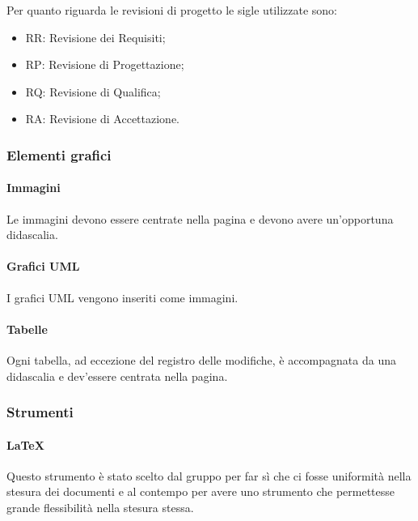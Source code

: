 Per quanto riguarda le revisioni di progetto le sigle utilizzate sono:
\begin{itemize}
    \item RR: Revisione dei Requisiti;
    \item RP: Revisione di Progettazione;
    \item RQ: Revisione di Qualifica;
    \item RA: Revisione di Accettazione.
\end{itemize}

\subsubsection{Elementi grafici}
\label{ssub:elementi_grafici}

\paragraph{Immagini}
\label{par:immagini}

Le immagini devono essere centrate nella pagina e devono avere un'opportuna didascalia.

\paragraph{Grafici UML}
\label{par:uml}

I grafici UML vengono inseriti come immagini.

\paragraph{Tabelle}
\label{par:tabelle}

Ogni tabella, ad eccezione del registro delle modifiche, è accompagnata da una didascalia e dev'essere centrata nella 
pagina.

\subsubsection{Strumenti}
\label{ssub:strumenti}

\paragraph{\LaTeX}
\label{par:latex}

Questo strumento è stato scelto dal gruppo per far sì che ci fosse uniformità nella stesura dei documenti e al contempo 
per avere uno strumento che permettesse grande flessibilità nella stesura stessa.


